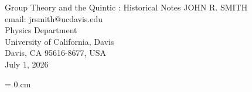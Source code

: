 \documentclass[epsf]{article}
\begin{document}

\begin{center}{{\twelvebf Group Theory and the Quintic : Historical Notes}}
\vglue 1.0cm
{\tenrm JOHN R.\,\,SMITH\\}
{email: jrsmith@ucdavis.edu\\}
\vglue 0.25cm
\baselineskip=13pt
{\tenit Physics Department\\
University of California, Davis\\}
\baselineskip=12pt
{\tenit Davis, CA 95616-8677, USA\\}
\vglue 0.5cm
{\rm July 1, 2026 \\}
\end{center}


%


\parindent = 0.cm
\twelverm
\baselineskip=14pt
\noindent

%
%

%
\end{document}
